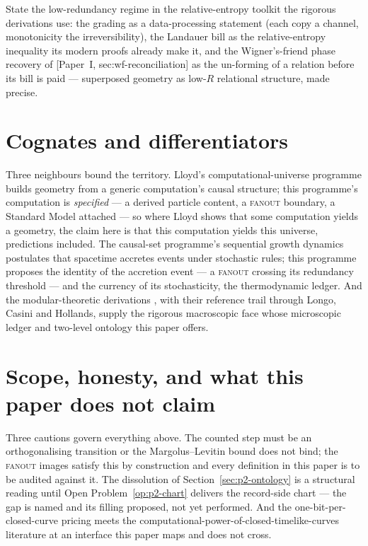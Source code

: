 \documentclass[11pt,a4paper]{article}
\newcommand{\Pone}[1]{[Paper~I, #1]} %
\newcommand{\fanout}{\textsc{fanout}}
\begin{document}
\begin{openproblem}\label{op:p2-nascent}
State the low-redundancy regime in the relative-entropy toolkit the rigorous derivations use:
the grading as a data-processing statement (each copy a channel, monotonicity the
irreversibility), the Landauer bill as the relative-entropy inequality its modern proofs already
make it, and the Wigner's-friend phase recovery of \Pone{sec:wf-reconciliation} as the un-forming
of a relation before its bill is paid --- superposed geometry as low-$R$ relational structure,
made precise.
\end{openproblem}

\section{Cognates and differentiators}
\label{sec:p2-cognates}


Three neighbours bound the territory. Lloyd's computational-universe programme
\autocite{lloyd2005quantum} builds geometry from a generic computation's causal structure; this
programme's computation is \emph{specified} --- a derived particle content, a \fanout{} boundary,
a Standard Model attached --- so where Lloyd shows that some computation yields a geometry, the
claim here is that this computation yields this universe, predictions included. The causal-set
programme's sequential growth dynamics \autocite{rideoutsorkin2000} postulates that spacetime
accretes events under stochastic rules; this programme proposes the identity of the accretion
event --- a \fanout{} crossing its redundancy threshold --- and the currency of its
stochasticity, the thermodynamic ledger. And the modular-theoretic derivations
\autocite{doraumuch2026relative}, with their reference trail through Longo, Casini and Hollands,
supply the rigorous macroscopic face whose microscopic ledger and two-level ontology this paper
offers.

\section{Scope, honesty, and what this paper does not claim}
\label{sec:p2-scope}


Three cautions govern everything above. The counted step must be an orthogonalising transition or
the Margolus--Levitin bound does not bind; the \fanout{} images satisfy this by construction and
every definition in this paper is to be audited against it. The dissolution of
Section~\ref{sec:p2-ontology} is a structural reading until Open Problem~\ref{op:p2-chart}
delivers the record-side chart --- the gap is named and its filling proposed, not yet performed.
And the one-bit-per-closed-curve pricing meets the computational-power-of-closed-timelike-curves
literature at an interface this paper maps and does not cross.

\renewcommand{\listtheoremname}{Open Problems of Paper II}
\listoftheorems[ignoreall, show={openproblem}]

\printbibliography
\end{document}
